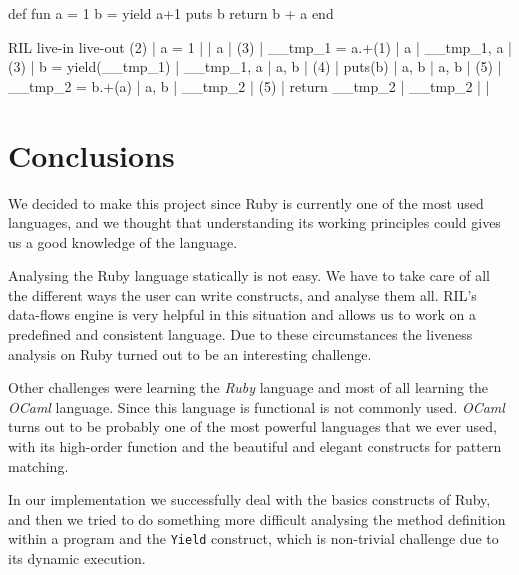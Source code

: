 \documentclass[a4paper]{article}   %
\begin{document}
\begin{ruby}
def fun
	a = 1
	b = yield a+1
	puts b
	return b + a
end
\end{ruby}
\begin{bash}
      RIL                  live-in       live-out
(2) | a = 1              |             | a           | 
(3) | __tmp_1 = a.+(1)   | a           | __tmp_1, a  | 
(3) | b = yield(__tmp_1) | __tmp_1, a  | a, b        | 
(4) | puts(b)            | a, b        | a, b        | 
(5) | __tmp_2 = b.+(a)   | a, b        | __tmp_2     | 
(5) | return __tmp_2     | __tmp_2     |             | 
\end{bash}

\pagebreak
\section{Conclusions}

We decided to make this project since Ruby is currently one of the most used languages, and we thought that understanding its working principles could gives us a good knowledge of the language.

Analysing the Ruby language statically is not easy. We have to take care of all the different ways the user can write constructs, and analyse them all. 
RIL's data-flows engine is very helpful in this situation and allows us to work on a predefined and consistent language.
Due to these circumstances the liveness analysis on Ruby turned out to be an interesting challenge.

Other challenges were learning the \emph{Ruby} language and most of all learning the \emph{OCaml} language. Since this language is functional is not commonly used. \emph{OCaml} turns out to be probably one of the most powerful languages that we ever used, with its high-order function and the beautiful and elegant constructs for pattern matching.

In our implementation we successfully deal with the basics constructs of Ruby, and then we tried to do something more difficult analysing the method definition within a program and the \texttt{Yield} construct, which is non-trivial challenge due to its dynamic execution.
\end{document}
